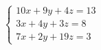 \documentclass[preview]{standalone}
\begin{document}
\begin{align*}
\begin{cases} 10x + 9y + 4z = 13 \\ 3x + 4y + 3z = 8 \\ 7x + 2y + 19z = 3 \end{cases}
\end{align*}
\end{document}

